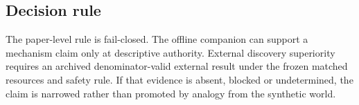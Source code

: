 \subsection{Decision rule}
The paper-level rule is fail-closed.  The offline companion can support a
mechanism claim only at descriptive authority.  External discovery superiority
requires an archived denominator-valid external result under the frozen matched
resources and safety rule.  If that evidence is absent, blocked or
undetermined, the claim is narrowed rather than promoted by analogy from the
synthetic world.
